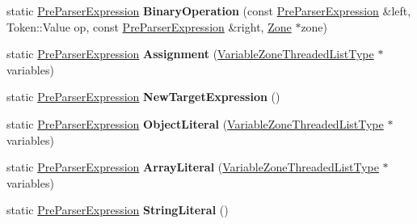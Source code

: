 \begin{DoxyCompactItemize}
static \mbox{\hyperlink{classv8_1_1internal_1_1PreParserExpression}{Pre\+Parser\+Expression}} {\bfseries Binary\+Operation} (const \mbox{\hyperlink{classv8_1_1internal_1_1PreParserExpression}{Pre\+Parser\+Expression}} \&left, Token\+::\+Value op, const \mbox{\hyperlink{classv8_1_1internal_1_1PreParserExpression}{Pre\+Parser\+Expression}} \&right, \mbox{\hyperlink{classv8_1_1internal_1_1Zone}{Zone}} $\ast$zone)
\item 
\mbox{\label{classv8_1_1internal_1_1PreParserExpression_aeac7b4b4122a6db962daa57a3b958195}} 
static \mbox{\hyperlink{classv8_1_1internal_1_1PreParserExpression}{Pre\+Parser\+Expression}} {\bfseries Assignment} (\mbox{\hyperlink{classv8_1_1base_1_1ThreadedListBase}{Variable\+Zone\+Threaded\+List\+Type}} $\ast$variables)
\item 
\mbox{\label{classv8_1_1internal_1_1PreParserExpression_a79c10fe48e6d26d517c356019781b001}} 
static \mbox{\hyperlink{classv8_1_1internal_1_1PreParserExpression}{Pre\+Parser\+Expression}} {\bfseries New\+Target\+Expression} ()
\item 
\mbox{\label{classv8_1_1internal_1_1PreParserExpression_aa3e4ecb953e0820dd712b3662ff6db3d}} 
static \mbox{\hyperlink{classv8_1_1internal_1_1PreParserExpression}{Pre\+Parser\+Expression}} {\bfseries Object\+Literal} (\mbox{\hyperlink{classv8_1_1base_1_1ThreadedListBase}{Variable\+Zone\+Threaded\+List\+Type}} $\ast$variables)
\item 
\mbox{\label{classv8_1_1internal_1_1PreParserExpression_a551fcf4d13ae0b27a14114cc2922d56a}} 
static \mbox{\hyperlink{classv8_1_1internal_1_1PreParserExpression}{Pre\+Parser\+Expression}} {\bfseries Array\+Literal} (\mbox{\hyperlink{classv8_1_1base_1_1ThreadedListBase}{Variable\+Zone\+Threaded\+List\+Type}} $\ast$variables)
\item 
\mbox{\label{classv8_1_1internal_1_1PreParserExpression_ab9f3abe6a770ea41fbb8987efe7c38b9}} 
static \mbox{\hyperlink{classv8_1_1internal_1_1PreParserExpression}{Pre\+Parser\+Expression}} {\bfseries String\+Literal} ()
\item 
\mbox{\label{classv8_1_1internal_1_1PreParserExpression_a68d8db6e0595163c7d1744a07cc6b929}} 

\end{DoxyCompactItemize}
